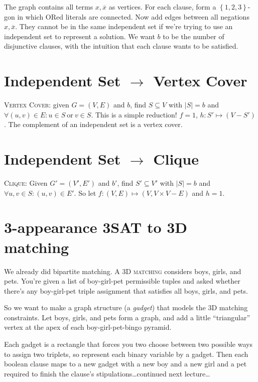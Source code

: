 The graph contains all terms \(x, \overline{x}\) as vertices.
For each clause, form a \(\left\{1,2,3\right\}\)-gon in which ORed literals
are connected. 
Now add edges between all negations \(x, \overline{x}\).
They cannot be in the same independent set if we're trying to use an independent set to represent a solution.
We want \(b\) to be the number of disjunctive clauses, with the intuition that each
clause wants to be satisfied.

\section{Independent Set \(\to\) Vertex Cover}
\textsc{Vertex Cover}: given \(G = (V, E)\) and \(b\), find \(S\subseteq V\) with \(\left|S\right| = b\) and \(\forall \left(u, v\right)\in E: u\in S\ \text{or}\ v\in S\).
This is a simple reduction! \(f = 1\), \(h: S'\mapsto \left(V - S'\right)\).
The complement of an independent set is a vertex cover.

\section{Independent Set \(\to\) Clique}
\textsc{Clique}:
Given \(G' = \left(V', E'\right)\) and \(b'\), find \(S'\subseteq V'\) with \(\left|S\right| = b\) and \(\forall u, v \in S: (u,v) \in E'\).
So let \(f: \left(V, E\right) \mapsto \left(V, V\times V - E\right)\) and \(h=1\).

\section{3-appearance 3SAT to 3D matching}
We already did bipartite matching. A \textsc{3D matching} considers boys, girls, and pets. You're given a list of boy-girl-pet permissible tuples and asked whether there's any boy-girl-pet triple assignment that satisfies all boys, girls, and pets.

So we want to make a graph structure (a \emph{gadget}) that models the 3D matching constraints.
Let boys, girls, and pets form a graph, and add a little ``triangular'' vertex
at the apex of each boy-girl-pet-bingo pyramid.

Each gadget is a rectangle that forces you two choose between two possible ways to assign two triplets, so represent each binary variable by a gadget.
Then each boolean clause maps to a new gadget with a new boy and a new girl and a pet required to finish the clause's stipulations\ldots continued next lecture\ldots